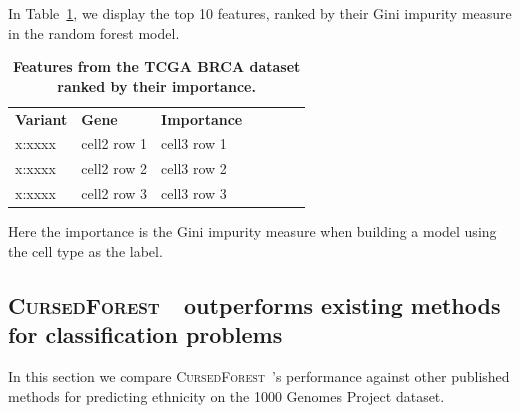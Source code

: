 \documentclass[10pt,letterpaper]{article}
\newlength\savedwidth
\newcommand\thickhline{\noalign{\global\savedwidth\arrayrulewidth\global\arrayrulewidth 2pt}%
\hline
\noalign{\global\arrayrulewidth\savedwidth}}
\newcommand{\cursedforest}{\textsc{CursedForest}\ }
\begin{document}
In Table~\ref{featuretable}, we display the top 10 features, ranked by their Gini impurity measure in the random forest model.

\begin{table}[!ht]
\centering
\caption{
{\bf Features from the TCGA BRCA dataset ranked by their importance.}}
\begin{tabular}{|l|l|l|l|l|l|l|}
\hline
{\bf Variant} & {\bf Gene} & {\bf Importance}\\ \thickhline
x:xxxx & cell2 row 1 & cell3 row 1\\ \hline
x:xxxx & cell2 row 2 & cell3 row 2\\ \hline
x:xxxx & cell2 row 3 & cell3 row 3\\ \hline
\end{tabular}
\begin{flushleft} 
Here the importance is the Gini impurity measure when building a model using the cell type as the label.
\end{flushleft}
\label{featuretable}
\end{table}






\subsection{\cursedforest\ outperforms existing methods for classification problems}
In this section we compare \cursedforest 's performance against other published methods for predicting ethnicity on the
1000 Genomes Project dataset.
\end{document}
